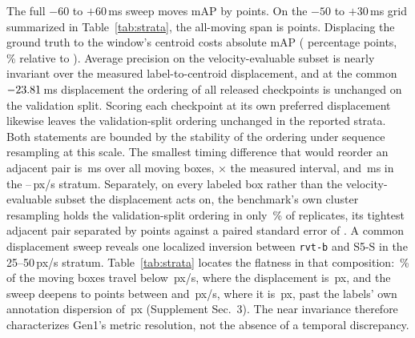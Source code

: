 \documentclass[10pt,twocolumn,letterpaper]{article}
\begin{document}
The full $-60$ to $+60$\,ms sweep moves mAP by \mapSweepSpan{} points. On the
$-50$ to $+30$\,ms grid summarized in Table~\ref{tab:strata}, the all-moving
span is \stSpanAll{} points. Displacing the ground truth to the window's centroid
costs \mapCostAbs{} absolute mAP (\mapCost{} percentage points,
\mapCostPct\,\% relative to \mapZero{}). Average precision on the velocity-evaluable
subset is nearly invariant over the measured label-to-centroid displacement, and at
the common $-23.81$\,ms displacement the ordering of all
\rankCkpts{} released checkpoints is unchanged on the validation split. Scoring each checkpoint at its own
preferred displacement likewise leaves the validation-split ordering unchanged in the reported
strata. Both statements are bounded by the stability of the
ordering under sequence resampling at this scale. The smallest timing difference that would reorder an adjacent
pair is \dstarAll\,ms over all moving boxes,
\dstarAllTau$\times$ the measured interval, and \dstarMid\,ms in the
\mapCutMid--\mapCutHi\,px/s stratum. Separately, on every labeled box rather than the
velocity-evaluable subset the displacement acts on, the benchmark's own cluster resampling
holds the validation-split ordering in only \rankHoldBox\,\% of replicates, its tightest
adjacent pair separated by \rankGapMin{} points against a paired standard error of
\rankGapMinSE{}. A common displacement sweep reveals one localized
inversion between \texttt{rvt-b} and S5-S in the 25--50\,px/s stratum.
Table~\ref{tab:strata} locates the
flatness in that composition: \stShareSlow\,\% of the moving boxes travel below
\mapCutLo\,px/s, where the displacement is \stPxSlow\,px, and the sweep deepens
to \mapSpanHigh{} points between \mapCutMid{} and \mapCutHi\,px/s, where it is
\stPxHigh\,px, past the labels' own annotation dispersion of
\,px (Supplement Sec.~3).
The near invariance therefore characterizes Gen1's metric resolution, not the absence of a
temporal discrepancy.
\end{document}
